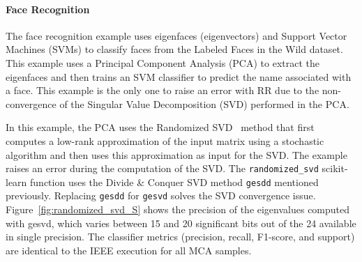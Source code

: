 \documentclass[11pt]{article}
\begin{document}






\paragraph{Face Recognition}

The face recognition example uses eigenfaces (eigenvectors) and Support Vector Machines (SVMs) to classify faces from the Labeled Faces in the Wild dataset. This example uses a Principal Component Analysis (PCA) to extract the eigenfaces and then trains an SVM classifier to predict the name associated with a face. This example is the only one to raise an error with RR due to the non-convergence of the Singular Value Decomposition (SVD) performed in the PCA.

In this example, the PCA uses the Randomized SVD~\cite{halko2011finding} method that first computes a low-rank approximation of the input matrix using a stochastic algorithm and then uses this approximation as input for the SVD. The example raises an error during the computation of the SVD.
The \texttt{randomized\_svd} scikit-learn function uses the Divide \& Conquer SVD method \texttt{gesdd} mentioned previously.
Replacing \texttt{gesdd} for \texttt{gesvd} solves the SVD convergence issue. Figure~\ref{fig:randomized_svd_S} shows the precision of the eigenvalues computed with gesvd, which varies between 15 and 20 significant bits out of the 24 available in single precision. The classifier metrics (precision, recall, F1-score, and support) are identical to the IEEE execution for all MCA samples.
\end{document}
